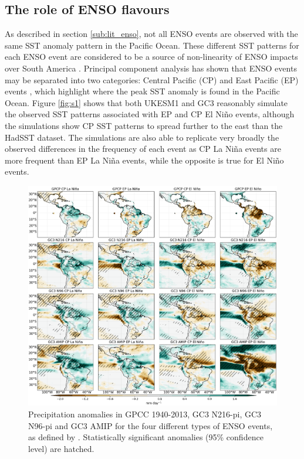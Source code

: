 \subsection{The role of ENSO flavours}
  



  
As described in section \ref{sub:lit_enso}, not all ENSO events are observed with the same SST anomaly pattern in the Pacific Ocean. These different SST patterns for each ENSO event are considered to be a source of non-linearity of ENSO impacts over South America \citep{sulca2018,cai2020}.
Principal component analysis has shown that ENSO events may be separated into two categories: Central Pacific (CP) and East Pacific (EP) events \citep{cai2020}, which highlight where the peak SST anomaly is found in the Pacific Ocean.
Figure \ref{fig:s1} shows that both UKESM1 and GC3 reasonably simulate the observed SST patterns associated with EP and CP El Niño events, although the simulations show CP SST patterns to spread further to the east than the HadSST dataset.
The simulations are also able to replicate very broadly the observed differences in the frequency of each event as CP La Niña events are more frequent than EP La Niña events, while the opposite is true for El Niño events.

\begin{figure}[t!]
\includegraphics[width=\linewidth]{figures/cppranomalies_ff}
\caption{Precipitation anomalies in GPCC 1940-2013, GC3 N216-pi, GC3 N96-pi and GC3 AMIP for the four different types of ENSO events, as defined by \cite{cai2020}. Statistically significant anomalies (95\% confidence level) are hatched.}
\label{fig:senso}
\end{figure}  


